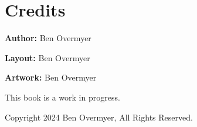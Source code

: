 \chapter{Credits}

\textbf{Author:} Ben Overmyer

\textbf{Layout:} Ben Overmyer

\textbf{Artwork:} Ben Overmyer

This book is a work in progress.

Copyright 2024 Ben Overmyer, All Rights Reserved.
